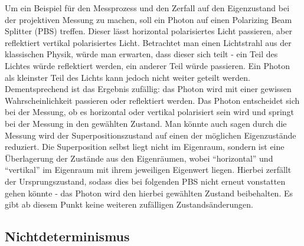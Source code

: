 Um ein Beispiel für den Messprozess und den Zerfall auf den Eigenzustand bei der projektiven Messung zu machen, soll ein Photon auf einen Polarizing Beam Splitter (PBS) treffen. Dieser lässt horizontal polarisiertes Licht passieren, aber reflektiert vertikal polarisiertes Licht.
Betrachtet man einen Lichtstrahl aus der klassischen Physik, würde man erwarten, dass dieser sich teilt - ein Teil des Lichtes würde reflektiert werden, ein anderer Teil würde passieren. Ein Photon als kleinster Teil des Lichts kann jedoch nicht weiter geteilt werden.
Dementsprechend ist das Ergebnis zufällig: das Photon wird mit einer gewissen Wahrscheinlichkeit passieren oder reflektiert werden. Das Photon entscheidet sich bei der Messung, ob es horizontal oder vertikal polarisiert sein wird und springt bei der Messung in den gewählten Zustand.
Man könnte auch sagen durch die Messung wird der Superpositionszustand auf einen der möglichen Eigenzustände reduziert. Die Superposition selbst liegt nicht im Eigenraum, sondern ist eine Überlagerung der Zustände aus den Eigenräumen, wobei ``horizontal'' und ``vertikal'' im Eigenraum mit ihrem jeweiligen Eigenwert liegen. Hierbei zerfällt der Ursprungszustand, sodass dies bei folgenden PBS nicht erneut vonstatten gehen könnte - das Photon wird den hierbei gewählten Zustand beibehalten.
Es gibt ab diesem Punkt keine weiteren zufälligen Zustandsänderungen. 
\cite{lvovsky_quantum_2018}

\subsection{Nichtdeterminismus}

